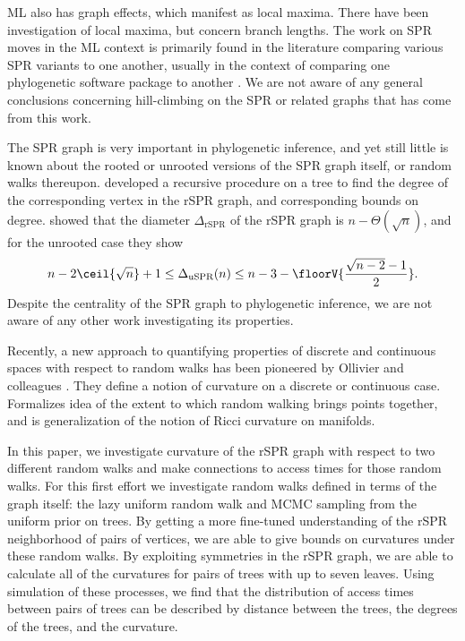 \documentclass{amsart}
\begin{document}
ML also has graph effects, which manifest as local maxima.
There have been investigation of local maxima, but concern branch lengths.
\cite{Fukami1989-fs,Steel1994-pt,Chor2003-wh,Chor2000-ea}
The work on SPR moves in the ML context is primarily found in the literature comparing various SPR variants to one another, usually in the context of comparing one phylogenetic software package to another \cite{Hordijk2005-dl,Stamatakis2006-yz,Price2010-fi,Guindon2010-lo}.
We are not aware of any general conclusions concerning hill-climbing on the SPR or related graphs that has come from this work.

The SPR graph is very important in phylogenetic inference, and yet still little is known about the rooted or unrooted versions of the SPR graph itself, or random walks thereupon.
\cite{Song2003-gf} developed a recursive procedure on a tree to find the degree of the corresponding vertex in the rSPR graph, and corresponding bounds on degree.
\cite{Ding2011-bj} showed that the diameter $\Delta_{\text{rSPR}}$ of the rSPR graph is $n - \Theta(\sqrt n)$, and for the unrooted case they show
$$ n - 2\ceil{\sqrt{n}} + 1
\le \Delta_{\text{uSPR}}(n)
\le n - 3 - \floorV{\frac{\sqrt{n - 2} - 1}{2}}.
$$
Despite the centrality of the SPR graph to phylogenetic inference, we are not aware of any other work investigating its properties.

Recently, a new approach to quantifying properties of discrete and continuous spaces with respect to random walks has been pioneered by Ollivier and colleagues \cite{Ollivier2009-bw,Joulin2010-jg}.
They define a notion of curvature on a discrete or continuous case.
Formalizes idea of the extent to which random walking brings points together, and is generalization of the notion of Ricci curvature on manifolds.

In this paper, we investigate curvature of the rSPR graph with respect to two different random walks and make connections to access times for those random walks.
For this first effort we investigate random walks defined in terms of the graph itself: the lazy uniform random walk and MCMC sampling from the uniform prior on trees.
By getting a more fine-tuned understanding of the rSPR neighborhood of pairs of vertices, we are able to give bounds on curvatures under these random walks.
By exploiting symmetries in the rSPR graph, we are able to calculate all of the curvatures for pairs of trees with up to seven leaves.
Using simulation of these processes, we find that the distribution of access times between pairs of trees can be described by distance between the trees, the degrees of the trees, and the curvature.
\end{document}
